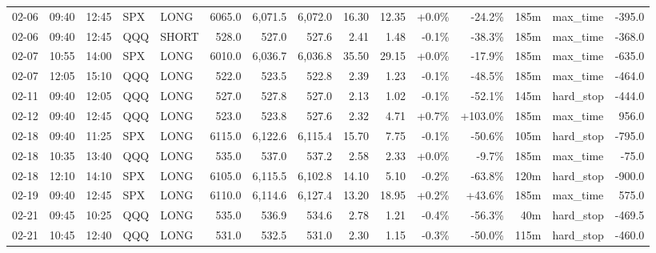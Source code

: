 \documentclass[11pt,a4paper,twoside]{article}
\begin{document}
\begin{landscape}
\begin{center}
\begin{longtable}{>{\color{txtmain}}l l l l l r r r r r r r r >{\color{txtmain}}l r}
02-06 & 09:40 & 12:45 & SPX & LONG & 6065.0 & 6,071.5 & 6,072.0 & 16.30 & 12.35 & \textcolor{wingreen}{+0.0\%} & \textcolor{lossred}{-24.2\%} & 185m & max\_time & \textcolor{lossred}{-395.0} \\
02-06 & 09:40 & 12:45 & QQQ & SHORT & 528.0 & 527.0 & 527.6 & 2.41 & 1.48 & \textcolor{lossred}{-0.1\%} & \textcolor{lossred}{-38.3\%} & 185m & max\_time & \textcolor{lossred}{-368.0} \\
02-07 & 10:55 & 14:00 & SPX & LONG & 6010.0 & 6,036.7 & 6,036.8 & 35.50 & 29.15 & \textcolor{wingreen}{+0.0\%} & \textcolor{lossred}{-17.9\%} & 185m & max\_time & \textcolor{lossred}{-635.0} \\
02-07 & 12:05 & 15:10 & QQQ & LONG & 522.0 & 523.5 & 522.8 & 2.39 & 1.23 & \textcolor{lossred}{-0.1\%} & \textcolor{lossred}{-48.5\%} & 185m & max\_time & \textcolor{lossred}{-464.0} \\
02-11 & 09:40 & 12:05 & QQQ & LONG & 527.0 & 527.8 & 527.0 & 2.13 & 1.02 & \textcolor{lossred}{-0.1\%} & \textcolor{lossred}{-52.1\%} & 145m & hard\_stop & \textcolor{lossred}{-444.0} \\
02-12 & 09:40 & 12:45 & QQQ & LONG & 523.0 & 523.8 & 527.6 & 2.32 & 4.71 & \textcolor{wingreen}{+0.7\%} & \textcolor{wingreen}{+103.0\%} & 185m & max\_time & \textcolor{wingreen}{956.0} \\
02-18 & 09:40 & 11:25 & SPX & LONG & 6115.0 & 6,122.6 & 6,115.4 & 15.70 & 7.75 & \textcolor{lossred}{-0.1\%} & \textcolor{lossred}{-50.6\%} & 105m & hard\_stop & \textcolor{lossred}{-795.0} \\
02-18 & 10:35 & 13:40 & QQQ & LONG & 535.0 & 537.0 & 537.2 & 2.58 & 2.33 & \textcolor{wingreen}{+0.0\%} & \textcolor{lossred}{-9.7\%} & 185m & max\_time & \textcolor{lossred}{-75.0} \\
02-18 & 12:10 & 14:10 & SPX & LONG & 6105.0 & 6,115.5 & 6,102.8 & 14.10 & 5.10 & \textcolor{lossred}{-0.2\%} & \textcolor{lossred}{-63.8\%} & 120m & hard\_stop & \textcolor{lossred}{-900.0} \\
02-19 & 09:40 & 12:45 & SPX & LONG & 6110.0 & 6,114.6 & 6,127.4 & 13.20 & 18.95 & \textcolor{wingreen}{+0.2\%} & \textcolor{wingreen}{+43.6\%} & 185m & max\_time & \textcolor{wingreen}{575.0} \\
02-21 & 09:45 & 10:25 & QQQ & LONG & 535.0 & 536.9 & 534.6 & 2.78 & 1.21 & \textcolor{lossred}{-0.4\%} & \textcolor{lossred}{-56.3\%} & 40m & hard\_stop & \textcolor{lossred}{-469.5} \\
02-21 & 10:45 & 12:40 & QQQ & LONG & 531.0 & 532.5 & 531.0 & 2.30 & 1.15 & \textcolor{lossred}{-0.3\%} & \textcolor{lossred}{-50.0\%} & 115m & hard\_stop & \textcolor{lossred}{-460.0} \\

\end{longtable}
\end{center}
\end{landscape}
\end{document}
